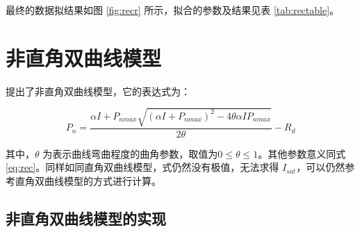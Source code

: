 \documentclass[
]{krantz}
\begin{document}
最终的数据拟结果如图 \ref{fig:recr} 所示，拟合的参数及结果见表 \ref{tab:rectable}。

\cleardoublepage

\hypertarget{nonrec_mod}{%
\section{非直角双曲线模型}\label{nonrec_mod}}

\citet{Thornley1976} 提出了非直角双曲线模型，它的表达式为：

\begin{equation}
P_{n} = \frac{\alpha I + P_{nmax} \sqrt{(\alpha I + P_{nmax})^{2} - 4  \theta \alpha I P_{nmax}}}{2 \theta} - R_{d}
\label{eq:nrec}
\end{equation}

其中，\(\theta\) 为表示曲线弯曲程度的曲角参数，取值为\(0\leq \theta \leq 1\)。其他参数意义同式 \eqref{eq:rec}。同样如同直角双曲线模型，式仍然没有极值，无法求得 \(I_{sat}\)，可以仍然参考直角双曲线模型的方式进行计算。

\hypertarget{nonrec_mode_exam}{%
\subsection{非直角双曲线模型的实现}\label{nonrec_mode_exam}}
\end{document}
